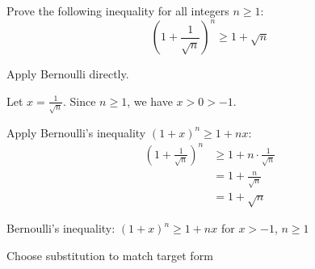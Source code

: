 \begin{problem}
Prove the following inequality for all integers $n \ge 1$:
\[ \left(1 + \frac{1}{\sqrt{n}}\right)^n \ge 1 + \sqrt{n} \]
\end{problem}

\begin{hint}
Apply Bernoulli directly.
\end{hint}

\begin{solution}
Let $x = \frac{1}{\sqrt{n}}$. Since $n \ge 1$, we have $x > 0 > -1$.

Apply Bernoulli's inequality $(1+x)^n \ge 1+nx$:
\begin{align*}
\left(1 + \frac{1}{\sqrt{n}}\right)^n &\ge 1 + n \cdot \frac{1}{\sqrt{n}}\\
&= 1 + \frac{n}{\sqrt{n}}\\
&= 1 + \sqrt{n}
\end{align*}
\end{solution}

\begin{takeaways}
\item Bernoulli's inequality: $(1+x)^n \ge 1+nx$ for $x > -1$, $n \ge 1$
\item Choose substitution to match target form
\end{takeaways}
